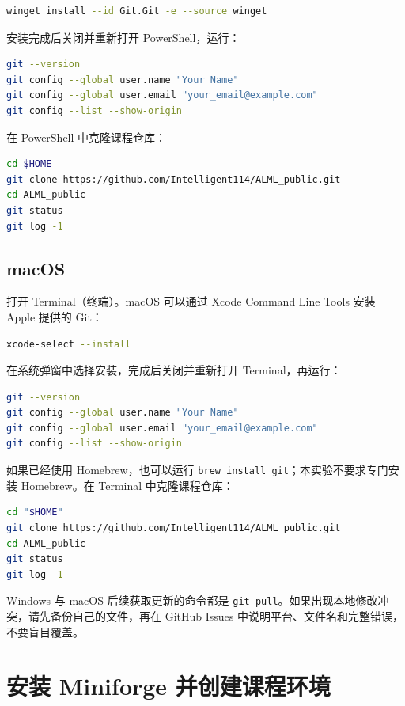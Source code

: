 \documentclass[11pt,a4paper]{article}
\newcommand{\macos}{\subsection*{\textcolor{macgray}{macOS}}}
\begin{document}
\begin{lstlisting}[language=bash]
winget install --id Git.Git -e --source winget
\end{lstlisting}

安装完成后关闭并重新打开 PowerShell，运行：

\begin{lstlisting}[language=bash]
git --version
git config --global user.name "Your Name"
git config --global user.email "your_email@example.com"
git config --list --show-origin
\end{lstlisting}

在 PowerShell 中克隆课程仓库：

\begin{lstlisting}[language=bash]
cd $HOME
git clone https://github.com/Intelligent114/ALML_public.git
cd ALML_public
git status
git log -1
\end{lstlisting}

\macos

打开 Terminal（终端）。macOS 可以通过 Xcode Command Line Tools 安装 Apple 提供的 Git：

\begin{lstlisting}[language=bash]
xcode-select --install
\end{lstlisting}

在系统弹窗中选择安装，完成后关闭并重新打开 Terminal，再运行：

\begin{lstlisting}[language=bash]
git --version
git config --global user.name "Your Name"
git config --global user.email "your_email@example.com"
git config --list --show-origin
\end{lstlisting}

如果已经使用 Homebrew，也可以运行 \texttt{brew install git}；本实验不要求专门安装 Homebrew。在 Terminal 中克隆课程仓库：

\begin{lstlisting}[language=bash]
cd "$HOME"
git clone https://github.com/Intelligent114/ALML_public.git
cd ALML_public
git status
git log -1
\end{lstlisting}

\begin{tipbox}
Windows 与 macOS 后续获取更新的命令都是 \texttt{git pull}。如果出现本地修改冲突，请先备份自己的文件，再在 GitHub Issues 中说明平台、文件名和完整错误，不要盲目覆盖。
\end{tipbox}

\section{安装 Miniforge 并创建课程环境}
\end{document}
